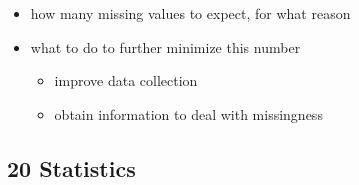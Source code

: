 \documentclass[
]{article}
\providecommand{\tightlist}{%
  \setlength{\itemsep}{0pt}\setlength{\parskip}{0pt}}
\begin{document}
\begin{itemize}
\begin{itemize}
    \begin{itemize}
    \tightlist
    \item
      how many missing values to expect, for what reason
    \item
      what to do to further minimize this number

      \begin{itemize}
      \tightlist
      \item
        improve data collection
      \item
        obtain information to deal with missingness
      \end{itemize}
    \end{itemize}
  \end{itemize}
\end{itemize}

\hypertarget{statistics}{%
\subsection{20 Statistics}\label{statistics}}
\end{document}
